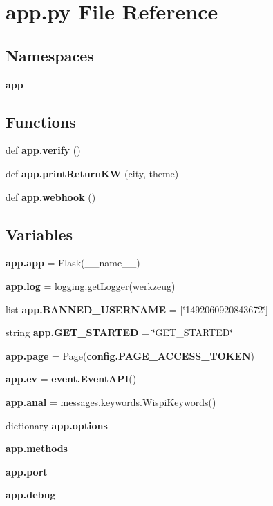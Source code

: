 \section{app.\+py File Reference}
\label{app_8py}
\subsection*{Namespaces}
\begin{DoxyCompactItemize}
\item 
 {\bf app}
\end{DoxyCompactItemize}
\subsection*{Functions}
\begin{DoxyCompactItemize}
\item 
def {\bf app.\+verify} ()
\item 
def {\bf app.\+print\+Return\+KW} (city, theme)
\item 
def {\bf app.\+webhook} ()
\end{DoxyCompactItemize}
\subsection*{Variables}
\begin{DoxyCompactItemize}
\item 
{\bf app.\+app} = Flask(\+\_\+\+\_\+name\+\_\+\+\_\+)
\item 
{\bf app.\+log} = logging.\+get\+Logger(\textquotesingle{}werkzeug\textquotesingle{})
\item 
list {\bf app.\+B\+A\+N\+N\+E\+D\+\_\+\+U\+S\+E\+R\+N\+A\+ME} = [\char`\"{}1492060920843672\char`\"{}]
\item 
string {\bf app.\+G\+E\+T\+\_\+\+S\+T\+A\+R\+T\+ED} = \char`\"{}G\+E\+T\+\_\+\+S\+T\+A\+R\+T\+ED\char`\"{}
\item 
{\bf app.\+page} = Page({\bf config.\+P\+A\+G\+E\+\_\+\+A\+C\+C\+E\+S\+S\+\_\+\+T\+O\+K\+EN})
\item 
{\bf app.\+ev} = {\bf event.\+Event\+A\+PI}()
\item 
{\bf app.\+anal} = messages.\+keywords.\+Wispi\+Keywords()
\item 
dictionary {\bf app.\+options}
\item 
{\bf app.\+methods}
\item 
{\bf app.\+port}
\item 
{\bf app.\+debug}
\end{DoxyCompactItemize}
